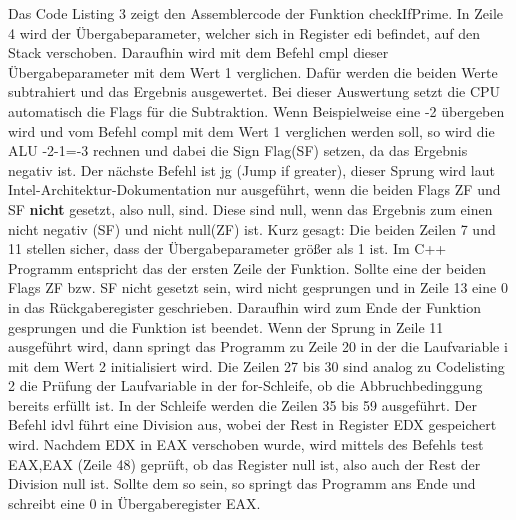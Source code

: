 \documentclass[12pt]{article}
\begin{document}
Das Code Listing 3 zeigt den Assemblercode der Funktion checkIfPrime. In Zeile 4 wird der Übergabeparameter, welcher sich in Register edi befindet, auf den Stack verschoben. Daraufhin wird mit dem Befehl cmpl dieser Übergabeparameter mit dem Wert 1 verglichen. Dafür werden die beiden Werte subtrahiert und das Ergebnis ausgewertet. Bei dieser Auswertung setzt die CPU automatisch die Flags für die Subtraktion. Wenn Beispielweise eine -2 übergeben wird und vom Befehl compl mit dem Wert 1 verglichen werden soll, so wird die ALU -2-1=-3 rechnen und dabei die Sign Flag(SF) setzen, da das Ergebnis negativ ist. Der nächste Befehl ist jg (Jump if greater), dieser Sprung wird laut Intel-Architektur-Dokumentation nur ausgeführt, wenn die beiden Flags ZF und SF \textbf{nicht} gesetzt, also null, sind. Diese sind null, wenn das Ergebnis zum einen nicht negativ (SF) und nicht null(ZF) ist. \newline Kurz gesagt: Die beiden Zeilen 7 und 11 stellen sicher, dass der Übergabeparameter größer als 1 ist. Im C++ Programm entspricht das der ersten Zeile der Funktion. Sollte eine der beiden Flags ZF bzw. SF nicht gesetzt sein, wird nicht gesprungen und in Zeile 13 eine 0 in das Rückgaberegister geschrieben. Daraufhin wird zum Ende der Funktion gesprungen und die Funktion ist beendet. Wenn der Sprung in Zeile 11 ausgeführt wird, dann springt das Programm zu Zeile 20 in der die Laufvariable i  mit dem Wert 2 initialisiert wird. Die Zeilen 27 bis 30 sind analog zu Codelisting 2 die Prüfung der Laufvariable in der for-Schleife, ob die Abbruchbedinggung bereits erfüllt ist. In der Schleife werden die Zeilen 35 bis 59 ausgeführt. Der Befehl idvl führt eine Division aus, wobei der Rest in Register EDX gespeichert wird. Nachdem EDX in EAX verschoben wurde, wird mittels des Befehls test EAX,EAX (Zeile 48) geprüft, ob das Register null ist, also auch der Rest der Division null ist. Sollte dem so sein, so springt das Programm ans Ende und schreibt eine 0 in Übergaberegister EAX.


\newpage

\end{document}
